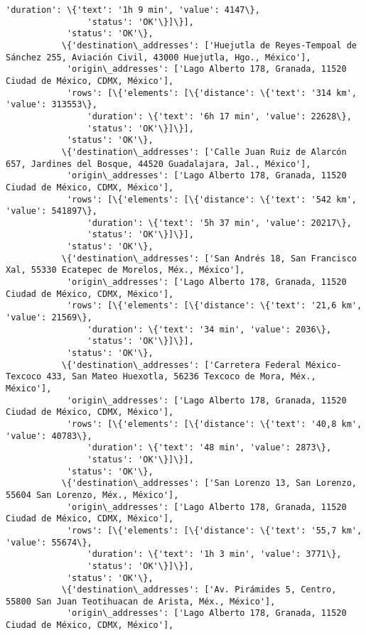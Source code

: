 \documentclass[11pt]{article}
\begin{document}
\begin{Verbatim}[commandchars=\\\{\}]
                'duration': \{'text': '1h 9 min', 'value': 4147\},
                'status': 'OK'\}]\}],
            'status': 'OK'\},
           \{'destination\_addresses': ['Huejutla de Reyes-Tempoal de Sánchez 255, Aviación Civil, 43000 Huejutla, Hgo., México'],
            'origin\_addresses': ['Lago Alberto 178, Granada, 11520 Ciudad de México, CDMX, México'],
            'rows': [\{'elements': [\{'distance': \{'text': '314 km', 'value': 313553\},
                'duration': \{'text': '6h 17 min', 'value': 22628\},
                'status': 'OK'\}]\}],
            'status': 'OK'\},
           \{'destination\_addresses': ['Calle Juan Ruiz de Alarcón 657, Jardines del Bosque, 44520 Guadalajara, Jal., México'],
            'origin\_addresses': ['Lago Alberto 178, Granada, 11520 Ciudad de México, CDMX, México'],
            'rows': [\{'elements': [\{'distance': \{'text': '542 km', 'value': 541897\},
                'duration': \{'text': '5h 37 min', 'value': 20217\},
                'status': 'OK'\}]\}],
            'status': 'OK'\},
           \{'destination\_addresses': ['San Andrés 18, San Francisco Xal, 55330 Ecatepec de Morelos, Méx., México'],
            'origin\_addresses': ['Lago Alberto 178, Granada, 11520 Ciudad de México, CDMX, México'],
            'rows': [\{'elements': [\{'distance': \{'text': '21,6 km', 'value': 21569\},
                'duration': \{'text': '34 min', 'value': 2036\},
                'status': 'OK'\}]\}],
            'status': 'OK'\},
           \{'destination\_addresses': ['Carretera Federal México-Texcoco 433, San Mateo Huexotla, 56236 Texcoco de Mora, Méx., México'],
            'origin\_addresses': ['Lago Alberto 178, Granada, 11520 Ciudad de México, CDMX, México'],
            'rows': [\{'elements': [\{'distance': \{'text': '40,8 km', 'value': 40783\},
                'duration': \{'text': '48 min', 'value': 2873\},
                'status': 'OK'\}]\}],
            'status': 'OK'\},
           \{'destination\_addresses': ['San Lorenzo 13, San Lorenzo, 55604 San Lorenzo, Méx., México'],
            'origin\_addresses': ['Lago Alberto 178, Granada, 11520 Ciudad de México, CDMX, México'],
            'rows': [\{'elements': [\{'distance': \{'text': '55,7 km', 'value': 55674\},
                'duration': \{'text': '1h 3 min', 'value': 3771\},
                'status': 'OK'\}]\}],
            'status': 'OK'\},
           \{'destination\_addresses': ['Av. Pirámides 5, Centro, 55800 San Juan Teotihuacan de Arista, Méx., México'],
            'origin\_addresses': ['Lago Alberto 178, Granada, 11520 Ciudad de México, CDMX, México'],

\end{Verbatim}
\end{document}
